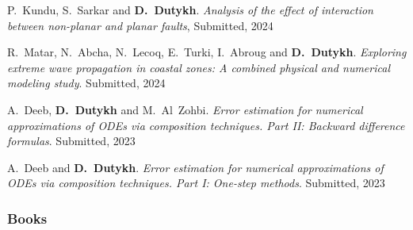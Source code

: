 \documentclass[final, a4paper, oneside, 12pt]{article}
\numberwithin{equation}{section}
\begin{document}
\begin{etaremune}
  \item P.~Kundu, S.~Sarkar and \textbf{D.~Dutykh}. \textit{Analysis of the effect of interaction between non-planar and planar faults}, Submitted, 2024 %

  \item R.~Matar, N.~Abcha, N.~Lecoq, E.~Turki, I.~Abroug and \textbf{D.~Dutykh}. \textit{Exploring extreme wave propagation in coastal zones: A combined physical and numerical modeling study}. Submitted, 2024 %

  \item A.~Deeb, \textbf{D.~Dutykh} and M.~Al~Zohbi. \textit{Error estimation for numerical approximations of ODEs via composition techniques. Part II: Backward difference formulas}. Submitted, 2023 %

  \item A.~Deeb and \textbf{D.~Dutykh}. \textit{Error estimation for numerical approximations of ODEs via composition techniques. Part I: One-step methods}. Submitted, 2023 %

\end{etaremune}

\subsubsection{Books}
\end{document}
